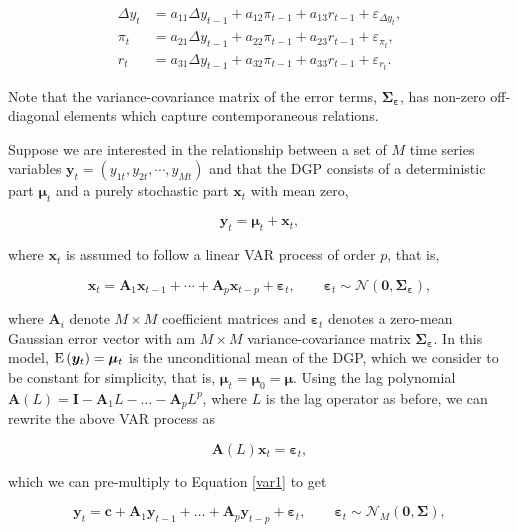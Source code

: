 \begin{align*}
	\Delta y_t &= a_{11}\Delta y_{t-1} + a_{12} \pi_{t-1} + a_{13}r_{t-1} + \varepsilon_{\Delta y_t}, \\
	\pi_t &= a_{21}\Delta y_{t-1} + a_{22} \pi_{t-1} + a_{23}r_{t-1} + \varepsilon_{\pi_t}, \\
	r_t &= a_{31}\Delta y_{t-1} + a_{32} \pi_{t-1} + a_{33}r_{t-1} + \varepsilon_{r_t}.
\end{align*}

Note that the variance-covariance matrix of the error terms, $\bm{\Sigma_\varepsilon}$, has non-zero off-diagonal elements which capture contemporaneous relations.

Suppose we are interested in the relationship between a set of $M$ time series variables $\bm{y}_t = (y_{1t},y_{2t},\cdots,y_{Mt})$ and that the DGP consists of a deterministic part $\bm{\mu}_t$ and a purely stochastic part $\bm{x}_t$ with mean zero,

\begin{equation}
	\label{var1}
	\bm{y}_t = \bm{\mu}_t + \bm{x}_t,
\end{equation}

where $\bm{x}_t$ is assumed to follow a linear VAR process of order $p$, that is,

\[
	\bm{x}_t = \bm{A}_1\bm{x}_{t-1} + \cdots + \bm{A}_p\bm{x}_{t-p} + \bm{\varepsilon}_t, \qquad \bm{\varepsilon}_t \sim \mathcal{N}(\bm{0},\bm{\Sigma_\varepsilon}),
\]

where $\bm{A}_i$ denote $M\times M$ coefficient matrices and $\bm{\varepsilon}_t$ denotes a zero-mean Gaussian error vector with am $M \times M$ variance-covariance matrix $\bm{\Sigma_\varepsilon}$. In this model, $\mathrm{E}\left({\bm{y}_t}\right) = \bm{\mu}_t$ is the unconditional mean of the DGP, which we consider to be constant for simplicity, that is,  $\bm{\mu}_t = \bm{\mu}_0 = \bm{\mu}$. Using the lag polynomial $\bm{A}(L) = \bm{I}-\bm{A}_1L-\ldots-\bm{A}_pL^p$, where $L$ is the lag operator as before, we can rewrite the above VAR process as

\[
	\bm{A}(L)\bm{x}_t = \bm{\varepsilon}_t,
\]

which we can pre-multiply to Equation \ref{var1} to get

\begin{equation}
	\bm{y}_t = \bm{c} + \bm{A}_1\bm{y}_{t-1} + \ldots + \bm{A}_p\bm{y}_{t-p} + \bm{\varepsilon}_t, \qquad \bm{\varepsilon}_t \sim \mathcal{N}_M(\bm{0},\bm{\Sigma}),
\end{equation}

